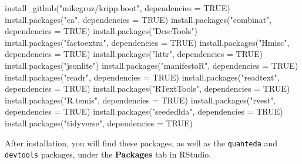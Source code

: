 \documentclass[
]{book}
\newenvironment{Shaded}{\begin{snugshade}}{\end{snugshade}}
\newcommand{\AttributeTok}[1]{\textcolor[rgb]{0.77,0.63,0.00}{#1}}
\newcommand{\ConstantTok}[1]{\textcolor[rgb]{0.00,0.00,0.00}{#1}}
\newcommand{\FunctionTok}[1]{\textcolor[rgb]{0.00,0.00,0.00}{#1}}
\newcommand{\NormalTok}[1]{#1}
\newcommand{\StringTok}[1]{\textcolor[rgb]{0.31,0.60,0.02}{#1}}
\begin{document}
\begin{Shaded}
\begin{Highlighting}[]
\FunctionTok{install\_github}\NormalTok{(}\StringTok{"mikegruz/kripp.boot"}\NormalTok{, }\AttributeTok{dependencies =} \ConstantTok{TRUE}\NormalTok{)}
\FunctionTok{install.packages}\NormalTok{(}\StringTok{"ca"}\NormalTok{, }\AttributeTok{dependencies =} \ConstantTok{TRUE}\NormalTok{)}
\FunctionTok{install.packages}\NormalTok{(}\StringTok{"combinat"}\NormalTok{, }\AttributeTok{dependencies =} \ConstantTok{TRUE}\NormalTok{)}
\FunctionTok{install.packages}\NormalTok{(}\StringTok{"DescTools"}\NormalTok{)}
\FunctionTok{install.packages}\NormalTok{(}\StringTok{"factoextra"}\NormalTok{, }\AttributeTok{dependencies =} \ConstantTok{TRUE}\NormalTok{)}
\FunctionTok{install.packages}\NormalTok{(}\StringTok{"Hmisc"}\NormalTok{, }\AttributeTok{dependencies =} \ConstantTok{TRUE}\NormalTok{)}
\FunctionTok{install.packages}\NormalTok{(}\StringTok{"httr"}\NormalTok{, }\AttributeTok{dependencies =} \ConstantTok{TRUE}\NormalTok{)}
\FunctionTok{install.packages}\NormalTok{(}\StringTok{"jsonlite"}\NormalTok{)}
\FunctionTok{install.packages}\NormalTok{(}\StringTok{"manifestoR"}\NormalTok{, }\AttributeTok{dependencies =} \ConstantTok{TRUE}\NormalTok{)}
\FunctionTok{install.packages}\NormalTok{(}\StringTok{"readr"}\NormalTok{, }\AttributeTok{dependencies =} \ConstantTok{TRUE}\NormalTok{)}
\FunctionTok{install.packages}\NormalTok{(}\StringTok{"readtext"}\NormalTok{, }\AttributeTok{dependencies =} \ConstantTok{TRUE}\NormalTok{)}
\FunctionTok{install.packages}\NormalTok{(}\StringTok{"RTextTools"}\NormalTok{, }\AttributeTok{dependencies =} \ConstantTok{TRUE}\NormalTok{)}
\FunctionTok{install.packages}\NormalTok{(}\StringTok{"R.temis"}\NormalTok{, }\AttributeTok{dependencies =} \ConstantTok{TRUE}\NormalTok{)}
\FunctionTok{install.packages}\NormalTok{(}\StringTok{"rvest"}\NormalTok{, }\AttributeTok{dependencies =} \ConstantTok{TRUE}\NormalTok{)}
\FunctionTok{install.packages}\NormalTok{(}\StringTok{"seededlda"}\NormalTok{, }\AttributeTok{dependencies =} \ConstantTok{TRUE}\NormalTok{)}
\FunctionTok{install.packages}\NormalTok{(}\StringTok{"tidyverse"}\NormalTok{, }\AttributeTok{dependencies =} \ConstantTok{TRUE}\NormalTok{)}
\end{Highlighting}
\end{Shaded}

After installation, you will find these packages, as well as the \texttt{quanteda} and \texttt{devtools} packages, under the \textbf{Packages} tab in RStudio.
\end{document}
